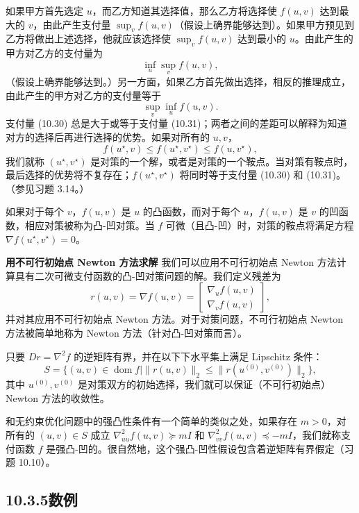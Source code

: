 \documentclass[UTF8, 12pt, fontset=fandol, oneside]{ctexart}
\begin{document}
如果甲方首先选定 $u$，而乙方知道其选择值，那么乙方将选择使 $f(u,v)$ 达到最大的 $v$，由此产生支付量 $\sup_v f(u,v)$（假设上确界能够达到）。如果甲方预见到乙方将做出上述选择，他就应该选择使 $\sup_v f(u,v)$ 达到最小的 $u$。由此产生的甲方对乙方的支付量为
\begin{equation}
\inf_u\sup_v f(u,v),
\tag{10.30}
\end{equation}
（假设上确界能够达到。）另一方面，如果乙方首先做出选择，相反的推理成立，由此产生的甲方对乙方的支付量等于
\begin{equation}
\sup_v\inf_u f(u,v).
\tag{10.31}
\end{equation}
支付量 (10.30) 总是大于或等于支付量 (10.31)；两者之间的差距可以解释为知道对方的选择后再进行选择的优势。如果对所有的 $u,v$，
\[
f(u^\star,v)\leq f(u^\star,v^\star)\leq f(u,v^\star),
\]
我们就称 $(u^\star,v^\star)$ 是对策的一个解，或者是对策的一个鞍点。当对策有鞍点时，最后选择的优势将不复存在；$f(u^\star,v^\star)$ 将同时等于支付量 (10.30) 和 (10.31)。（参见习题 3.14。）

如果对于每个 $v$，$f(u,v)$ 是 $u$ 的凸函数，而对于每个 $u$，$f(u,v)$ 是 $v$ 的凹函数，相应对策被称为凸-凹对策。当 $f$ 可微（且凸-凹）时，对策的鞍点将满足方程 $\nabla f(u^\star,v^\star)=0$。

\noindent\textbf{用不可行初始点 Newton 方法求解}\quad
我们可以应用不可行初始点 Newton 方法计算具有二次可微支付函数的凸-凹对策问题的解。我们定义残差为
\[
r(u,v)=\nabla f(u,v)=
\begin{bmatrix}
\nabla_u f(u,v)\\
\nabla_v f(u,v)
\end{bmatrix},
\]
并对其应用不可行初始点 Newton 方法。对于对策问题，不可行初始点 Newton 方法被简单地称为 Newton 方法（针对凸-凹对策而言）。

只要 $Dr=\nabla^2 f$ 的逆矩阵有界，并在以下下水平集上满足 Lipschitz 条件：
\[
S=\{(u,v)\in\operatorname{dom} f\mid \|r(u,v)\|_2\leq \|r(u^{(0)},v^{(0)})\|_2\},
\]
其中 $u^{(0)},v^{(0)}$ 是对策双方的初始选择，我们就可以保证（不可行初始点）Newton 方法的收敛性。

和无约束优化问题中的强凸性条件有一个简单的类似之处，如果存在 $m>0$，对所有的 $(u,v)\in S$ 成立 $\nabla^2_{uu}f(u,v)\succeq mI$ 和 $\nabla^2_{vv}f(u,v)\preceq -mI$，我们就称支付函数 $f$ 是强凸-凹的。很自然地，这个强凸-凹性假设包含着逆矩阵有界假定（习题 10.10）。

\subsection*{10.3.5\quad 数例}
\end{document}
